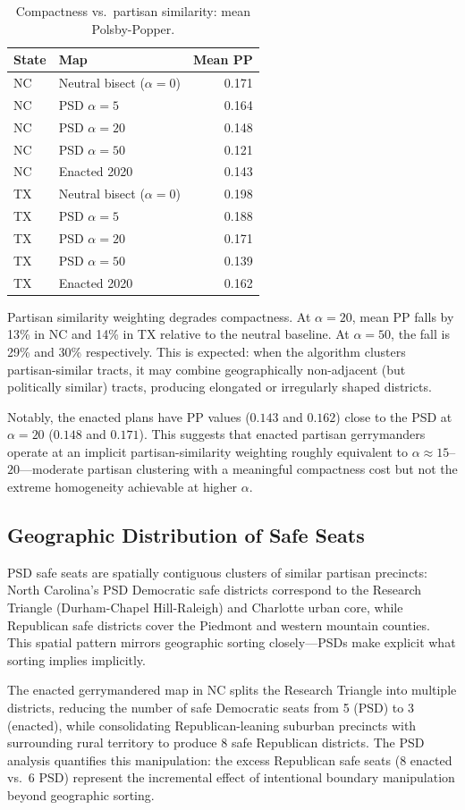\begin{table}[ht]
\centering
\caption{Compactness vs.\ partisan similarity: mean Polsby-Popper.\singrun}
\label{tab:psd-compactness}
\begin{tabular}{llr}
\toprule
State & Map & Mean PP \\
\midrule
NC & Neutral bisect ($\alpha=0$) & 0.171 \\
NC & PSD $\alpha=5$    & 0.164 \\
NC & PSD $\alpha=20$   & 0.148 \\
NC & PSD $\alpha=50$   & 0.121 \\
NC & Enacted 2020      & 0.143 \\
\midrule
TX & Neutral bisect ($\alpha=0$) & 0.198 \\
TX & PSD $\alpha=5$    & 0.188 \\
TX & PSD $\alpha=20$   & 0.171 \\
TX & PSD $\alpha=50$   & 0.139 \\
TX & Enacted 2020      & 0.162 \\
\bottomrule
\end{tabular}
\end{table}

Partisan similarity weighting degrades compactness.  At $\alpha = 20$, mean
PP falls by 13\% in NC and 14\% in TX relative to the neutral baseline.\singrun
At $\alpha = 50$, the fall is 29\% and 30\% respectively.  This is expected:
when the algorithm clusters partisan-similar tracts, it may combine
geographically non-adjacent (but politically similar) tracts, producing
elongated or irregularly shaped districts.

Notably, the enacted plans have PP values ($0.143$ and $0.162$) close to the
PSD at $\alpha = 20$ ($0.148$ and $0.171$).  This suggests that enacted
partisan gerrymanders operate at an implicit partisan-similarity weighting
roughly equivalent to $\alpha \approx 15$--$20$---moderate partisan clustering
with a meaningful compactness cost but not the extreme homogeneity achievable
at higher $\alpha$.

\subsection{Geographic Distribution of Safe Seats}

PSD safe seats are spatially contiguous clusters of similar partisan precincts:
North Carolina's PSD Democratic safe districts correspond to the Research
Triangle (Durham-Chapel Hill-Raleigh) and Charlotte urban core, while
Republican safe districts cover the Piedmont and western mountain counties.
This spatial pattern mirrors geographic sorting closely---PSDs make explicit
what sorting implies implicitly.

The enacted gerrymandered map in NC splits the Research Triangle into multiple
districts, reducing the number of safe Democratic seats from 5 (PSD) to 3
(enacted), while consolidating Republican-leaning suburban precincts with
surrounding rural territory to produce 8 safe Republican districts.  The PSD
analysis quantifies this manipulation: the excess Republican safe seats
(8 enacted vs.\ 6 PSD) represent the incremental effect of intentional
boundary manipulation beyond geographic sorting.
